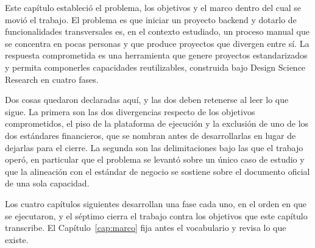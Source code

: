 Este capítulo estableció el problema, los objetivos y el marco dentro del
cual se movió el trabajo. El problema es que iniciar un proyecto backend y
dotarlo de funcionalidades transversales es, en el contexto estudiado, un
proceso manual que se concentra en pocas personas y que produce proyectos
que divergen entre sí. La respuesta comprometida es una herramienta que
genere proyectos estandarizados y permita componerles capacidades
reutilizables, construida bajo Design Science Research en cuatro fases.

Dos cosas quedaron declaradas aquí, y las dos deben retenerse al leer lo que
sigue. La primera son las dos divergencias respecto de los objetivos
comprometidos, el piso de la plataforma de ejecución y la exclusión de uno de
los dos estándares financieros, que se nombran antes de desarrollarlas en
lugar de dejarlas para el cierre. La segunda son las delimitaciones bajo las
que el trabajo operó, en particular que el problema se levantó sobre un único
caso de estudio y que la alineación con el estándar de negocio se sostiene
sobre el documento oficial de una sola capacidad.

Los cuatro capítulos siguientes desarrollan una fase cada uno, en el orden en
que se ejecutaron, y el séptimo cierra el trabajo contra los objetivos que
este capítulo transcribe. El Capítulo~\ref{cap:marco} fija antes el
vocabulario y revisa lo que existe.
